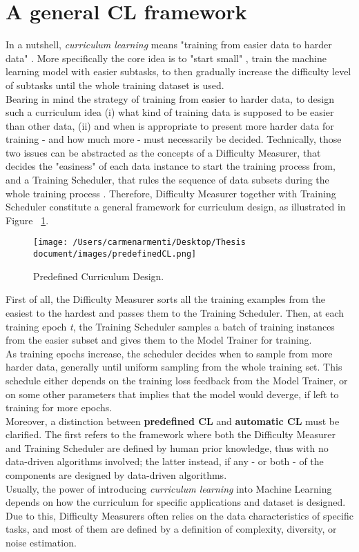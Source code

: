 \section{A general CL framework}
In a nutshell, \textit{curriculum learning} means "training from easier data to harder data" \cite{Wang2020}. More specifically the
core idea is to "start small" \cite{ELMAN199371}, train the machine learning model with easier subtasks, to then gradually increase
the difficulty level of subtasks until the whole training dataset is used.\\
Bearing in mind the strategy of training from easier to harder data, to design such a curriculum idea 
(i) what kind of training data is supposed to be easier than other data, (ii) and when is appropriate to present more harder
data for training - and how much more - must necessarily be decided.
Technically, those two issues can be abstracted as the concepts of a Difficulty Measurer, that decides the "easiness"
of each data instance to start the training process from, and a Training Scheduler, that rules the sequence of data subsets during 
the whole training process \cite{Wang2020}.
Therefore, Difficulty Measurer together with Training Scheduler constitute a general framework for curriculum design,
as illustrated in Figure ~\ref{fig:CLdesign}.
\begin{figure}[h]
    \begin{center}
        \texttt{[image: /Users/carmenarmenti/Desktop/Thesis document/images/predefinedCL.png]}
        \caption{\label{fig:CLdesign}Predefined Curriculum Design.}
    \end{center}
\end{figure}
First of all, the Difficulty Measurer sorts all the training examples from the easiest 
to the hardest and passes them to the Training Scheduler. Then, at each training epoch \textit{t}, the Training Scheduler
samples a batch of training instances from the easier subset and gives them to the Model Trainer for training.\\
As training epochs increase, the scheduler decides when to sample from more harder data, generally until uniform sampling
from the whole training set. This schedule either depends on the training loss feedback from the Model Trainer, or on some other
parameters that implies that the model would deverge, if left to training for more epochs.\\
Moreover, a distinction between \textbf{predefined CL} and \textbf{automatic CL} must be clarified. The first refers to the framework
where both the Difficulty Measurer and Training Scheduler are defined by human prior knowledge, thus with no data-driven
algorithms involved; the latter instead, if any - or both - of the components are designed by data-driven algorithms.\\
Usually, the power of introducing \textit{curriculum learning} into Machine Learning depends on how the curriculum for specific
applications and dataset is designed. Due to this, Difficulty Measurers often relies on the data
characteristics of specific tasks, and most of them are defined by a definition of complexity, diversity, or noise estimation.

